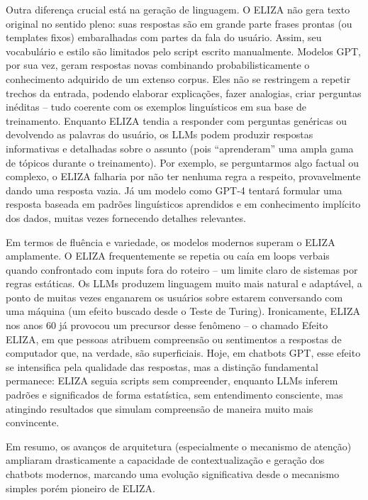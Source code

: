 \documentclass[a4paper,oneside]{book}
\begin{document}
Outra diferença crucial está na geração de linguagem. O ELIZA não gera texto original no sentido pleno: suas respostas são em grande parte frases prontas (ou templates fixos) embaralhadas com partes da fala do usuário. Assim, seu vocabulário e estilo são limitados pelo script escrito manualmente. Modelos GPT, por sua vez, geram respostas novas combinando probabilisticamente o conhecimento adquirido de um extenso corpus. Eles não se restringem a repetir trechos da entrada, podendo elaborar explicações, fazer analogias, criar perguntas inéditas – tudo coerente com os exemplos linguísticos em sua base de treinamento. Enquanto ELIZA tendia a responder com perguntas genéricas ou devolvendo as palavras do usuário, os LLMs podem produzir respostas informativas e detalhadas sobre o assunto (pois “aprenderam” uma ampla gama de tópicos durante o treinamento). Por exemplo, se perguntarmos algo factual ou complexo, o ELIZA falharia por não ter nenhuma regra a respeito, provavelmente dando uma resposta vazia. Já um modelo como GPT-4 tentará formular uma resposta baseada em padrões linguísticos aprendidos e em conhecimento implícito dos dados, muitas vezes fornecendo detalhes relevantes.

Em termos de fluência e variedade, os modelos modernos superam o ELIZA amplamente. O ELIZA frequentemente se repetia ou caía em loops verbais quando confrontado com inputs fora do roteiro – um limite claro de sistemas por regras estáticas. Os LLMs produzem linguagem muito mais natural e adaptável, a ponto de muitas vezes enganarem os usuários sobre estarem conversando com uma máquina (um efeito buscado desde o Teste de Turing). Ironicamente, ELIZA nos anos 60 já provocou um precursor desse fenômeno – o chamado Efeito ELIZA, em que pessoas atribuem compreensão ou sentimentos a respostas de computador que, na verdade, são superficiais. Hoje, em chatbots GPT, esse efeito se intensifica pela qualidade das respostas, mas a distinção fundamental permanece: ELIZA seguia scripts sem compreender, enquanto LLMs inferem padrões e significados de forma estatística, sem entendimento consciente, mas atingindo resultados que simulam compreensão de maneira muito mais convincente. 

Em resumo, os avanços de arquitetura (especialmente o mecanismo de atenção) ampliaram drasticamente a capacidade de contextualização e geração dos chatbots modernos, marcando uma evolução significativa desde o mecanismo simples porém pioneiro de ELIZA.

\end{document}
